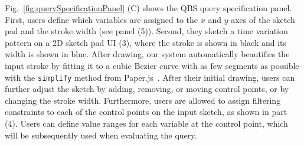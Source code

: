 Fig.~\ref{fig:querySpecificationPanel} (C) shows the QBS query specification panel.
First, users define which variables are assigned to the $x$ and $y$ axes of the sketch pad and the stroke width (see panel (5)).
Second, they sketch a time variation pattern on a 2D sketch pad UI (3),
where the stroke is shown in black and its width is shown in blue.
After drawing, our system automatically beautifies the input stroke by fitting it to a cubic Bezier curve with as few segments as possible with the \texttt{simplify} method from Paper.js~\cite{paper_framework}.
After their initial drawing, users can further adjust the sketch
by adding, removing, or moving control points, or by changing the stroke width.
Furthermore, users are allowed to assign filtering constraints to each of the control points on the input sketch, as shown in part (4).
Users can define value ranges for each variable at the control point, which will be subsequently used when evaluating the query.


